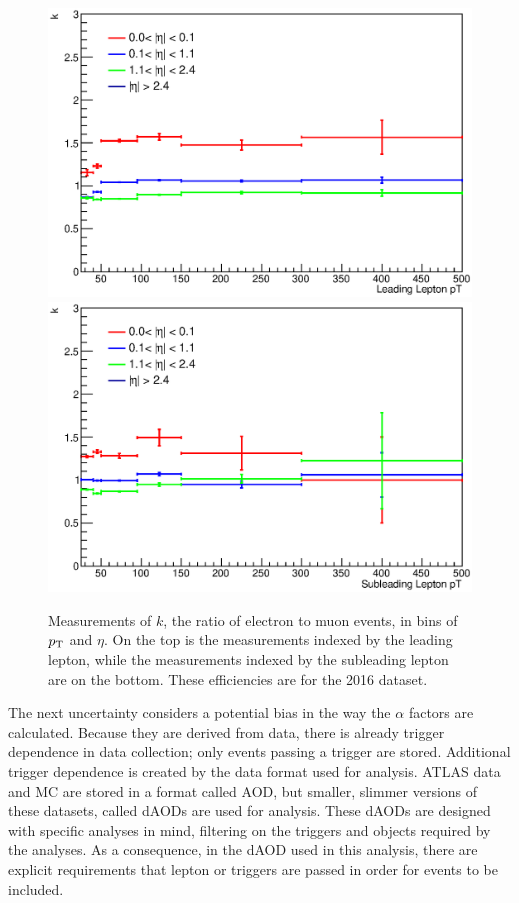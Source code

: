 \begin{centering}
\begin{figure}[!hbt]
\myfloatalign
\includegraphics[width=.85\linewidth]{figures/fs/data_efficiencies_2j_Z_lep0.eps}
\includegraphics[width=.85\linewidth]{figures/fs/data_efficiencies_2j_Z_lep1.eps}
\caption{Measurements of $k$, the ratio of electron to muon events, in bins of $p_{\text{T}}$ and $\eta$. On the top is the measurements indexed by the leading lepton, while the measurements indexed by the subleading lepton are on the bottom. These efficiencies are for the 2016 dataset.}
\label{fig:fs_k}
\end{figure}
\end{centering}

The next uncertainty considers a potential bias in the way the $\alpha$ factors are calculated. Because they are derived from data, there is already trigger dependence in data collection; only events passing a trigger are stored. Additional trigger dependence is created by the data format used for analysis. \ac{ATLAS} data and \ac{MC} are stored in a format called \ac{AOD}, but smaller, slimmer versions of these datasets, called \acp{dAOD} are used for analysis. These \acp{dAOD} are designed with specific analyses in mind, filtering on the triggers and objects required by the analyses. As a consequence, in the \ac{dAOD} used in this analysis, there are explicit requirements that lepton or \met triggers are passed in order for events to be included. 

